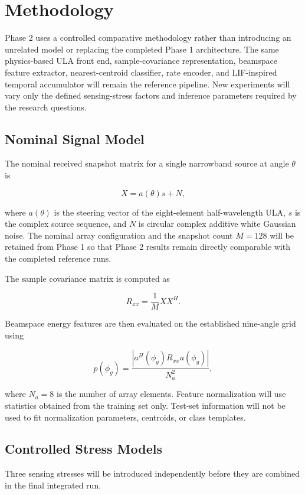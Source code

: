 \section{Methodology}

Phase 2 uses a controlled comparative methodology rather than introducing an unrelated model or replacing the completed Phase 1 architecture. The same physics-based ULA front end, sample-covariance representation, beamspace feature extractor, nearest-centroid classifier, rate encoder, and LIF-inspired temporal accumulator will remain the reference pipeline. New experiments will vary only the defined sensing-stress factors and inference parameters required by the research questions.

\subsection{Nominal Signal Model}

The nominal received snapshot matrix for a single narrowband source at angle $\theta$ is

\[
X = a(\theta)s + N,
\]

where $a(\theta)$ is the steering vector of the eight-element half-wavelength ULA, $s$ is the complex source sequence, and $N$ is circular complex additive white Gaussian noise. The nominal array configuration and the snapshot count $M=128$ will be retained from Phase 1 so that Phase 2 results remain directly comparable with the completed reference runs.

The sample covariance matrix is computed as

\[
R_{xx}=\frac{1}{M}XX^{H}.
\]

Beamspace energy features are then evaluated on the established nine-angle grid using

\[
p(\phi_g)=\frac{\left|a^{H}(\phi_g)R_{xx}a(\phi_g)\right|}{N_a^2},
\]

where $N_a=8$ is the number of array elements. Feature normalization will use statistics obtained from the training set only. Test-set information will not be used to fit normalization parameters, centroids, or class templates.

\subsection{Controlled Stress Models}

Three sensing stresses will be introduced independently before they are combined in the final integrated run.

